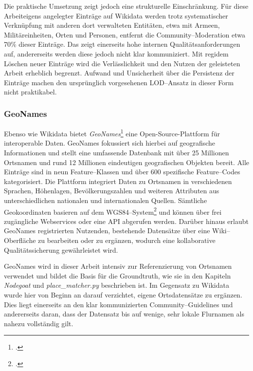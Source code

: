 \documentclass[12pt, a4paper, ngerman, bidi=default]{article}
\let\cite\footcite
\begin{document}
Die praktische Umsetzung zeigt jedoch eine strukturelle Einschränkung. Für diese Arbeiteigens angelegter Einträge auf Wikidata werden
trotz systematischer Verknüpfung mit anderen dort verwalteten Entitäten, etwa mit Armeen, Militäreinheiten, Orten und Personen, entfernt die Community–Moderation etwa 70\% dieser Einträge. 
Das zeigt einerseits hohe internen Qualitätsanforderungen auf, andererseits werden diese jedoch nicht klar kommuniziert. Mit regidem Löschen neuer Einträge wird die Verlässlichkeit und den Nutzen der 
geleisteten Arbeit erheblich begrenzt. 
Aufwand und Unsicherheit über die Persistenz der Einträge machen den ursprünglich vorgesehenen LOD–Ansatz in dieser Form nicht praktikabel.

\subsubsection{GeoNames}

Ebenso wie Wikidata bietet \textit{GeoNames}\cite[vgl.][]{noauthor_geonames_nodate} eine Open-Source-Plattform für interoperable Daten. GeoNames fokussiert sich hierbei auf geografische Informationen 
und stellt eine umfassende Datenbank mit über 25 Millionen Ortsnamen und rund 12 Millionen eindeutigen geografischen Objekten bereit.  
Alle Einträge sind in neun Feature–Klassen und über 600 spezifische Feature–Codes kategorisiert. Die Plattform integriert Daten zu 
Ortsnamen in verschiedenen Sprachen, Höhenlagen, Bevölkerungszahlen und weiteren Attributen aus unterschiedlichen nationalen und internationalen Quellen.  
Sämtliche Geokoordinaten basieren auf dem WGS84–System\cite[\textit{WGS84: geodätische Grundlage des Global Positioning System (GPS)};vgl.][]{noauthor_wgs84_nodate}
und können über frei zugängliche Webservices oder eine API abgerufen werden.  
Darüber hinaus erlaubt GeoNames registrierten Nutzenden, bestehende Datensätze über eine Wiki–Oberfläche zu bearbeiten oder zu ergänzen, wodurch eine 
kollaborative Qualitätssicherung gewährleistet wird.

GeoNames wird in dieser Arbeit intensiv zur Referenzierung von Ortsnamen verwendet und bildet die Basis für die Groundtruth, wie sie in den Kapiteln \textit{Nodegoat} und 
\textit{place\_matcher.py} beschrieben ist. Im Gegensatz zu Wikidata wurde hier von Beginn an darauf verzichtet, eigene Ortsdatensätze zu ergänzen. Dies liegt einerseits an 
den klar kommunizierten Community–Guidelines und andererseits daran, dass der Datensatz bis auf wenige, sehr lokale Flurnamen als nahezu vollständig gilt.
\end{document}
